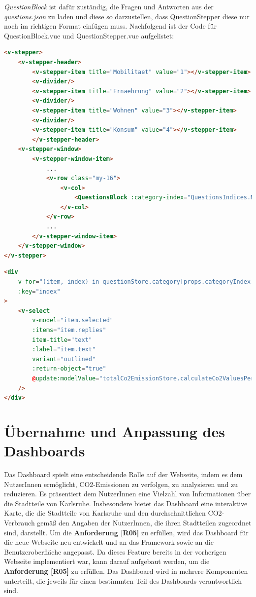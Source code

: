 \textit{QuestionBlock} ist dafür zuständig, die Fragen und Antworten aus der \textit{questions.json} zu laden und diese so darzustellen, dass QuestionStepper diese nur noch im richtigen Format einfügen muss.
Nachfolgend ist der Code für QuestionBlock.vue und QuestionStepper.vue aufgelistet:

\begin{lstlisting}[language={html}, caption={QuestionStepper.vue}]
<v-stepper>
    <v-stepper-header>
        <v-stepper-item title="Mobilitaet" value="1"></v-stepper-item>
        <v-divider/>
        <v-stepper-item title="Ernaehrung" value="2"></v-stepper-item>
        <v-divider/>
        <v-stepper-item title="Wohnen" value="3"></v-stepper-item>
        <v-divider/>
        <v-stepper-item title="Konsum" value="4"></v-stepper-item>
        </v-stepper-header>
    <v-stepper-window>
        <v-stepper-window-item>
            ...
            <v-row class="my-16">
                <v-col>
                    <QuestionsBlock :category-index="QuestionsIndices.MOBILITY"/>
                </v-col>
            </v-row>
            ...
        </v-stepper-window-item>
    </v-stepper-window>
</v-stepper>
\end{lstlisting}

\begin{lstlisting}[language={html}, caption={QuestionBlock.vue}]
<div
    v-for="(item, index) in questionStore.category[props.categoryIndex].questions"
    :key="index"
>
    <v-select
        v-model="item.selected"
        :items="item.replies"
        item-title="text"
        :label="item.text"
        variant="outlined"
        :return-object="true"
        @update:modelValue="totalCo2EmissionStore.calculateCo2ValuesPerCategory()"
    />
</div>
\end{lstlisting}

\section{Übernahme und Anpassung des Dashboards}

Das Dashboard spielt eine entscheidende Rolle auf der Webseite, indem es dem NutzerInnen ermöglicht, CO2-Emissionen zu verfolgen, zu analysieren und zu reduzieren. Es präsentiert dem NutzerInnen eine Vielzahl von Informationen über die Stadtteile von Karlsruhe. Insbesondere bietet das Dashboard eine interaktive Karte, die die Stadtteile von Karlsruhe und den durchschnittlichen CO2-Verbrauch gemäß den Angaben der NutzerInnen, die ihren Stadtteilen zugeordnet sind, darstellt. Um die \textbf{Anforderung [R05]} zu erfüllen, wird das Dashboard für die neue Webseite neu entwickelt und an das Framework sowie an die Benutzeroberfläche angepasst. Da dieses Feature bereits in der vorherigen Webseite implementiert war, kann darauf aufgebaut werden, um die \textbf{Anforderung [R05]} zu erfüllen. Das Dashboard wird in mehrere Komponenten unterteilt, die jeweils für einen bestimmten Teil des Dashboards verantwortlich sind.


